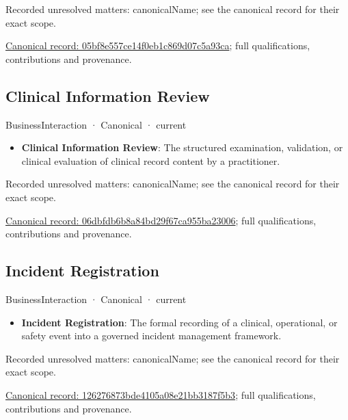 {\small Recorded unresolved matters: canonicalName; see the canonical record for their exact scope.}\par
{\footnotesize \href{../../../../continuum/business/business-interaction/05bf8e557ce14f0eb1c869d07c5a93ca.md}{Canonical record: 05bf8e557ce14f0eb1c869d07c5a93ca}; full qualifications, contributions and provenance.}\par
\subsection{Clinical Information Review}

\label{element:06dbfdb6b8a84bd29f67ca955ba23006}
{\small BusinessInteraction · Canonical · current}\par

\begin{itemize}


\item \textbf{Clinical Information Review}: The structured examination, validation, or clinical evaluation of clinical record content by a practitioner.

\end{itemize}

{\small Recorded unresolved matters: canonicalName; see the canonical record for their exact scope.}\par
{\footnotesize \href{../../../../continuum/business/business-interaction/06dbfdb6b8a84bd29f67ca955ba23006.md}{Canonical record: 06dbfdb6b8a84bd29f67ca955ba23006}; full qualifications, contributions and provenance.}\par
\subsection{Incident Registration}

\label{element:126276873bde4105a08e21bb3187f5b3}
{\small BusinessInteraction · Canonical · current}\par

\begin{itemize}


\item \textbf{Incident Registration}: The formal recording of a clinical, operational, or safety event into a governed incident management framework.

\end{itemize}

{\small Recorded unresolved matters: canonicalName; see the canonical record for their exact scope.}\par
{\footnotesize \href{../../../../continuum/business/business-interaction/126276873bde4105a08e21bb3187f5b3.md}{Canonical record: 126276873bde4105a08e21bb3187f5b3}; full qualifications, contributions and provenance.}\par
